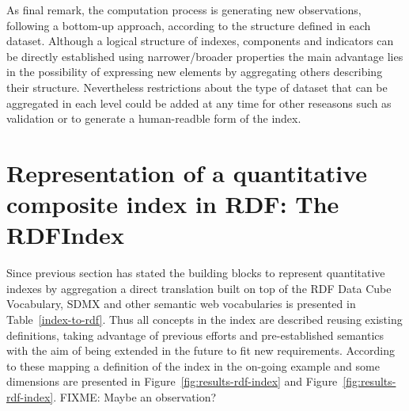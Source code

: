 \documentclass{llncs}
\begin{document}
As final remark, the computation process is generating new observations, following a bottom-up approach, according to the structure defined 
in each dataset. Although a logical structure of indexes, components and indicators can be directly established using narrower/broader properties 
the main advantage lies in the possibility of expressing new elements by aggregating others describing their structure. Nevertheless restrictions 
about the type of dataset that can be aggregated in each level could be added at any time for other reseasons such as validation or to generate 
a human-readble form of the index.


\section{Representation of a quantitative composite index in RDF: The RDFIndex}
Since previous section has stated the building blocks to represent quantitative indexes by aggregation a direct translation built 
on top of the RDF Data Cube Vocabulary, SDMX and other semantic web vocabularies is presented in Table~\ref{index-to-rdf}. Thus 
all concepts in the index are described reusing existing definitions, taking advantage of previous efforts and pre-established semantics 
with the aim of being extended in the future to fit new requirements. According to these mapping a definition of the index in the 
on-going example and some dimensions are presented in Figure~\ref{fig:results-rdf-index} and Figure~\ref{fig:results-rdf-index}.
FIXME: Maybe an observation?
\end{document}
